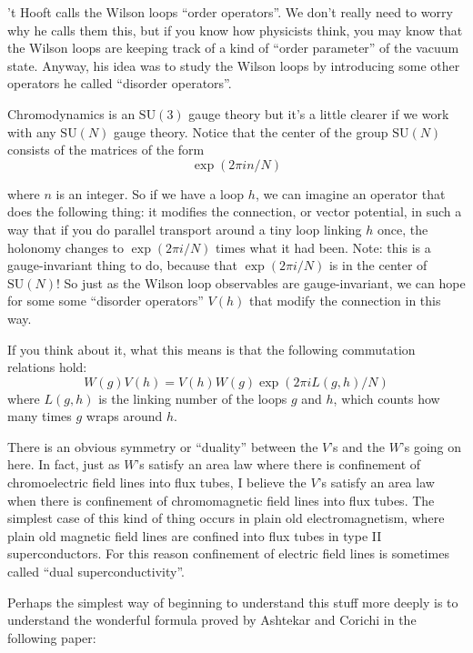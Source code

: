 \documentclass{article}
\def\tightlist{}
\renewcommand{\texttt}[1]{%
  \begingroup
  \ttfamily
  \begingroup\lccode`~=`/\lowercase{\endgroup\def~}{/\discretionary{}{}{}}%
  \begingroup\lccode`~=`[\lowercase{\endgroup\def~}{[\discretionary{}{}{}}%
  \begingroup\lccode`~=`.\lowercase{\endgroup\def~}{.\discretionary{}{}{}}%
  \catcode`/=\active\catcode`[=\active\catcode`.=\active
  \scantokens{#1\noexpand}%
  \endgroup
}
\begin{document}
't Hooft calls the Wilson loops ``order operators''. We don't really
need to worry why he calls them this, but if you know how physicists
think, you may know that the Wilson loops are keeping track of a kind of
``order parameter'' of the vacuum state. Anyway, his idea was to study
the Wilson loops by introducing some other operators he called
``disorder operators''.

Chromodynamics is an \(\mathrm{SU}(3)\) gauge theory but it's a little
clearer if we work with any \(\mathrm{SU}(N)\) gauge theory. Notice that
the center of the group \(\mathrm{SU}(N)\) consists of the matrices of
the form \[\exp(2\pi in/N)\]

where \(n\) is an integer. So if we have a loop \(h\), we can imagine an
operator that does the following thing: it modifies the connection, or
vector potential, in such a way that if you do parallel transport around
a tiny loop linking \(h\) once, the holonomy changes to
\(\exp(2\pi i/N)\) times what it had been. Note: this is a
gauge-invariant thing to do, because that \(\exp(2\pi i/N)\) is in the
center of \(\mathrm{SU}(N)\)! So just as the Wilson loop observables are
gauge-invariant, we can hope for some some ``disorder operators''
\(V(h)\) that modify the connection in this way.

If you think about it, what this means is that the following commutation
relations hold: \[W(g) V(h) = V(h) W(g) \exp(2\pi i L(g,h)/N)\] where
\(L(g,h)\) is the linking number of the loops \(g\) and \(h\), which
counts how many times \(g\) wraps around \(h\).

There is an obvious symmetry or ``duality'' between the \(V\)'s and the
\(W\)'s going on here. In fact, just as \(W\)'s satisfy an area law
where there is confinement of chromoelectric field lines into flux
tubes, I believe the \(V\)'s satisfy an area law when there is
confinement of chromomagnetic field lines into flux tubes. The simplest
case of this kind of thing occurs in plain old electromagnetism, where
plain old magnetic field lines are confined into flux tubes in type II
superconductors. For this reason confinement of electric field lines is
sometimes called ``dual superconductivity''.

Perhaps the simplest way of beginning to understand this stuff more
deeply is to understand the wonderful formula proved by Ashtekar and
Corichi in the following paper:

\end{document}
